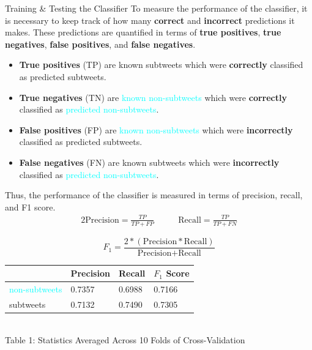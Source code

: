 \documentclass[12pt]{article}
\begin{document}
\begin{posterbard}
\begin{posterboxtitle}{Training \& Testing the Classifier}
To measure the performance of the classifier, it is necessary to keep track of how many \textbf{correct} and \textbf{incorrect} predictions it makes. These predictions are quantified in terms of \textbf{true positives}, \textbf{true negatives}, \textbf{false positives}, and \textbf{false negatives}.
\begin{itemize}
\item \textbf{True positives} (TP) are \textcolor{WildStrawberry}{known subtweets} which were \textbf{correctly} classified as \textcolor{WildStrawberry}{predicted subtweets}.
\item \textbf{True negatives} (TN) are \textcolor{Cyan}{known non-subtweets} which were \textbf{correctly} classified as \textcolor{Cyan}{predicted non-subtweets}.
\item \textbf{False positives} (FP) are \textcolor{Cyan}{known non-subtweets} which were \textbf{incorrectly} classified as \textcolor{WildStrawberry}{predicted subtweets}.
\item \textbf{False negatives} (FN) are \textcolor{WildStrawberry}{known subtweets} which were \textbf{incorrectly} classified as \textcolor{Cyan}{predicted non-subtweets}.
\end{itemize}
Thus, the performance of the classifier is measured in terms of precision, recall, and F1 score.
\begin{alignat*}{2}
  \text{Precision}=\frac{TP}{TP+FP}  &\qquad \text{Recall}=\frac{TP}{TP+FN} 
\end{alignat*}

\[F_{1}=\frac{2*(\text{Precision}*\text{Recall})}{\text{Precision}+\text{Recall}}\]

\begin{center}
	\begin{tabular}{ | p{8em} | p{5em} | p{5em} | p{5em} | }
		\hline
		&Precision&Recall&$F_{1}$ Score
		\\ 
		\hline
		\textcolor{cyan}{non-subtweets}&0.7357&0.6988&0.7166
		\\ 
		\hline
		\textcolor{WildStrawberry}{subtweets}&0.7132&0.7490&0.7305
		\\
		\hline
	\end{tabular}
	\medskip
	\\Table 1: Statistics Averaged Across 10 Folds of Cross-Validation
\end{center}

\end{posterboxtitle}


\end{posterbard}
\end{document}
